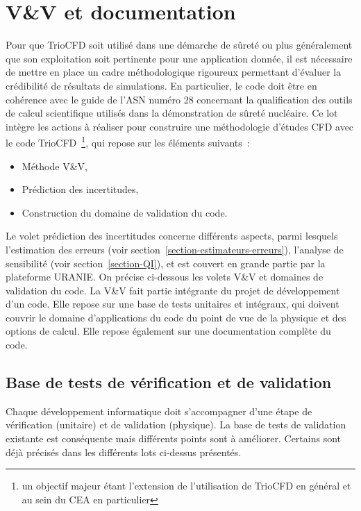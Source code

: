 \section{V\&V et documentation}
\label{section-vvdoc}

Pour que TrioCFD soit utilis\'e dans une d\'emarche de s\^uret\'e ou plus g\'en\'eralement que son exploitation soit pertinente pour une application donn\'ee, il est n\'ecessaire de mettre en place un cadre m\'ethodologique rigoureux permettant d'\'evaluer la cr\'edibilit\'e de r\'esultats de simulations. En particulier, le code doit \^etre en coh\'erence avec le guide de l'ASN num\'ero 28 concernant la qualification des outils de calcul scientifique utilis\'es dans la d\'emonstration de s\^uret\'e nucl\'eaire. 
Ce lot int\`egre les actions \`a r\'ealiser pour construire une m\'ethodologie d'\'etudes CFD avec le code TrioCFD~\footnote{un objectif majeur \'etant l'extension de l'utilisation de TrioCFD en g\'en\'eral et au sein du CEA en particulier}, qui repose sur les \'el\'ements suivants~:
\begin{itemize}
\item
M\'ethode V\&V,
\item
Pr\'ediction des incertitudes,
\item
Construction du domaine de validation du code.
\end{itemize}


Le volet pr\'ediction des incertitudes concerne diff\'erents aspects, parmi lesquels  l'estimation des erreurs (voir section~\ref{section-estimateurs-erreurs}), l'analyse de sensibilit\'e (voir section~\ref{section-QI}), et est couvert en grande partie par la plateforme URANIE.  On pr\'ecise ci-dessous les volets V\&V et domaines de validation du code.
La V\&V fait partie int\'egrante du projet de d\'eveloppement d'un code. Elle repose sur une base de tests unitaires et int\'egraux, qui doivent couvrir le domaine d'applications du code du point de vue de la physique et des options de calcul. Elle repose \'egalement sur une documentation compl\`ete du code.




\subsection{Base de tests de v\'erification et de validation}
 Chaque d\'eveloppement informatique doit s'accompagner d'une \'etape de v\'erification (unitaire) et de validation (physique). La base de tests  de validation existante est cons\'equente mais diff\'erents points sont \`a am\'eliorer. Certains sont d\'ej\`a pr\'ecis\'es dans les diff\'erents lots ci-dessus pr\'esent\'es.

